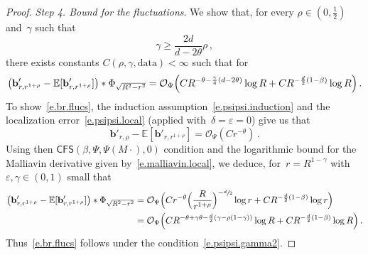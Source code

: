 \documentclass[11pt]{article} %
\numberwithin{equation}{section}
\theoremstyle{definition}
\newcommand{\eps}{\varepsilon}
\renewcommand{\b}{\ensuremath{\mathbf{b}}}
\newcommand{\ep}{\eps}
\newcommand{\E}{\mathbb{E}}
\renewcommand{\O}{\mathcal{O}}
\newcommand{\data}{\mathrm{data}}
\newcommand{\CFS}{\mathsf{CFS}}
\begin{document}
\begin{proof}
\smallskip 

\emph{Step 4. Bound for the fluctuations}. We show that, for every $\rho \in (0,\frac12)$ and~$\gamma$ such that 
\begin{equation} \label{e.psipsi.gamma2}
\gamma \geq \frac{2d}{d-2\theta} \rho \,,
\end{equation}
there exists constants $C(\rho,\gamma,\data) < \infty$ such that for
\begin{equation}  \label{e.br.flucs}
\bigl( \b'_{r,r^{1+\rho}} - \E [ \b'_{r,r^{1+\rho}} ] \bigr) \ast \Phi_{\sqrt{R^2-r^2}} 
= 
 \O_{\Psi} \Bigl(  C R^{-\theta - \frac{\gamma}{4}(d- 2\theta)}  \log R  + C R^{-\frac d2(1-\beta) } \log R  \Bigr) 
\,.
\end{equation}
To show~\eqref{e.br.flucs}, the induction assumption~\eqref{e.psipsi.induction} and the localization error~\eqref{e.psipsi.local} (applied with~$\delta = \ep = 0$) give us that 
\begin{equation*}  
 \b'_{r,\rho} - \E [ \b'_{r,r^{1+\rho}} ]  
 =  
 \O_{\Psi} (C r^{- \theta})
 \,.
\end{equation*}
Using then $\CFS(\beta,\Psi,\Psi(M \cdot),0)$ condition and the logarithmic bound for the Malliavin derivative given by~\eqref{e.malliavin.local}, we deduce, for~$r = R^{1-\gamma}$ with~$\ep,\gamma\in (0,1)$ small that
\begin{align*}  
\bigl( \b'_{r,r^{1+\rho}} - \E [ \b'_{r,r^{1+\rho}} ] \bigr) \ast \Phi_{\sqrt{R^2-r^2}}
 & = 
 \O_{\Psi} \Bigl( C r^{-\theta} \Bigl( \frac{R}{r^{1+\rho}} \Bigr)^{-\sfrac d2} \log r + C  R^{-\frac d2(1-\beta) } \log r  \Bigr)
  \\ & 
 =
 \O_{\Psi} \Bigl(  C R^{-\theta + \gamma \theta - \frac{d}{2} (\gamma - \rho(1-\gamma) ) }  \log R  + C R^{-\frac d2(1-\beta) } \log R  \Bigr) 
 \,.
\end{align*}
Thus~\eqref{e.br.flucs} follows under the condition~\eqref{e.psipsi.gamma2}.




\smallskip 


\end{proof}
\end{document}
